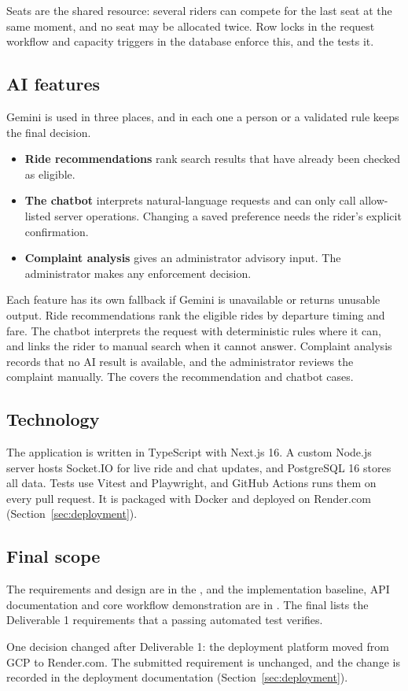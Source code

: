 Seats are the shared resource: several riders can compete for the last seat at the same moment, and no
seat may be allocated twice. Row locks in the request workflow and capacity triggers in the database
enforce this, and the  tests it.

\subsection{AI features}
Gemini is used in three places, and in each one a person or a validated rule keeps the final decision.
\begin{itemize}
  \item \textbf{Ride recommendations} rank search results that have already been checked as eligible.
  \item \textbf{The chatbot} interprets natural-language requests and can only call allow-listed server
    operations. Changing a saved preference needs the rider's explicit confirmation.
  \item \textbf{Complaint analysis} gives an administrator advisory input. The administrator makes any
    enforcement decision.
\end{itemize}
Each feature has its own fallback if Gemini is unavailable or returns unusable output. Ride recommendations
rank the eligible rides by departure timing and fare. The chatbot interprets the request with deterministic
rules where it can, and links the rider to manual search when it cannot answer. Complaint analysis records
that no AI result is available, and the administrator reviews the complaint manually. The
 covers the
recommendation and chatbot cases.

\subsection{Technology}
The application is written in TypeScript with Next.js 16. A custom Node.js server hosts Socket.IO for live
ride and chat updates, and PostgreSQL 16 stores all data. Tests use Vitest and Playwright, and GitHub
Actions runs them on every pull request. It is packaged with Docker and deployed on Render.com
(Section~\ref{sec:deployment}).

\subsection{Final scope}
The requirements and design are in the
, and the implementation baseline, API documentation
and core workflow demonstration are in . The final
 lists the
\TraceRequirements{} Deliverable 1 requirements that a passing automated test verifies.

One decision changed after Deliverable 1: the deployment platform moved from GCP to Render.com. The
submitted requirement is unchanged, and the change is recorded in the deployment documentation
(Section~\ref{sec:deployment}).
